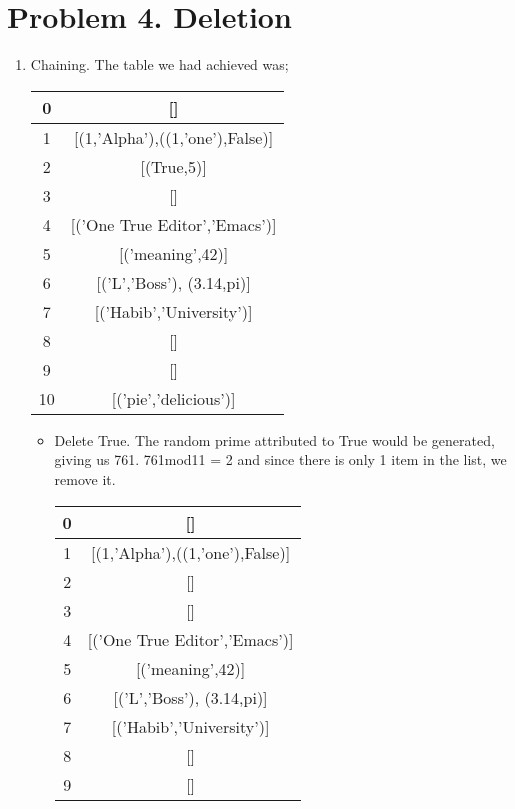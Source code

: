 \documentclass{article}
\begin{document}
\section*{Problem 4. Deletion}
	\begin{enumerate}
		\item Chaining. The table we had achieved was;
			\begin{center}
				\begin{tabular}{ |c|c| } 
					\hline
					0 & []   \\ 
					\hline
					1 &	[(1,'Alpha'),((1,'one'),False)] \\
					\hline 
					2 & [(True,5)]  \\ 
					\hline
					3&[]\\
					\hline
					4&[('One True Editor','Emacs')]\\
					\hline
					5&[('meaning',42)]\\
					\hline
					6&[('L','Boss'), (3.14,pi)]\\
					\hline
					7&[('Habib','University')]\\
					\hline
					8&[]\\
					\hline
					9&[]\\
					\hline
					10&[('pie','delicious')]\\
					\hline
				\end{tabular}
			\end{center}
		\begin{itemize}
			\item Delete True. The random prime attributed to True would be generated, giving us 761. 761mod11 = 2 and since there is only 1 item in the list, we remove it.
			\begin{center}
				\begin{tabular}{ |c|c| } 
					\hline
					0 & []   \\ 
					\hline
					1 &	[(1,'Alpha'),((1,'one'),False)] \\
					\hline 
					2 & []  \\ 
					\hline
					3&[]\\
					\hline
					4&[('One True Editor','Emacs')]\\
					\hline
					5&[('meaning',42)]\\
					\hline
					6&[('L','Boss'), (3.14,pi)]\\
					\hline
					7&[('Habib','University')]\\
					\hline
					8&[]\\
					\hline
					9&[]\\

\end{tabular}
\end{center}
\end{itemize}
\end{enumerate}
\end{document}

